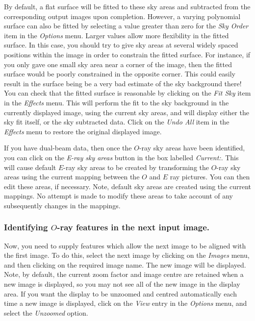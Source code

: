 \documentclass[11pt]{article}
\newcommand{\htmlref}[2]{#1}
\begin{document}
By default, a flat surface will be fitted to these sky areas and
subtracted from the corresponding output images upon completion. However,
a varying polynomial surface can also be fitted by selecting a value
greater than zero for the \htmlref{\emph{Sky Order}}{POLKA_SKYORDER} item
in the \htmlref{\emph{Options}}{POLKA_OPTIONS_MENU} menu. Larger values
allow more flexibility in the fitted surface. In this case, you should
try to give sky areas at several widely spaced positions within the image
in order to constrain the fitted surface. For instance, if you only gave
one small sky area near a corner of the image, then the fitted surface
would be poorly constrained in the opposite corner. This could easily
result in the surface being be a very bad estimate of the sky background
there! You can check that the fitted surface is reasonable by clicking on
the \htmlref{\emph{Fit Sky}}{POLKA_FITSKY_EFFECT} item in the
\htmlref{\emph{Effects}}{POLKA_EFFECTS_MENU} menu. This will perform
the fit to the sky background in the currently displayed image, using the
current sky areas, and will display either the sky fit itself, or the sky
subtracted data. Click on the
\htmlref{\emph{Undo All}}{POLKA_UNDO_ALL_EFFECTS} item in the
\htmlref{\emph{Effects}}{POLKA_EFFECTS_MENU} menu to restore the original
displayed image.

If you have dual-beam data, then once the $O$-ray sky areas have been
identified, you can click on the \emph{E-ray sky areas} button in the box
labelled \htmlref{\emph{Current:}}{POLKA_CURRENT}. This will cause default
$E$-ray sky areas to be created by transforming the $O$-ray sky areas
using the current mapping between the $O$ and $E$ ray pictures. You can
then \htmlref{edit}{POLKA_EDITING_POLYGONS} these
areas, if necessary. Note, default sky areas are created using the
current mappings. No attempt is made to modify these areas to take
account of any subsequently changes in the mappings.

\subsubsection {Identifying $O$-ray features in the next input image.}
Now, you need to supply features which allow the next image to be
aligned with the first image. To do this, select the next image by
clicking on the \htmlref{\emph{Images}}{POLKA_IMAGES} menu, and then
clicking on the required image name. The new image will be displayed.
Note, by default, the current zoom factor and image centre are retained
when a new image is displayed, so you may not see all of the new image in
the display area. If you want the display to be unzoomed and centred
automatically each time a new image is displayed, click on the
\htmlref{\emph{View}}{POLKA_VIEW} entry in the \htmlref{{\em
Options}}{POLKA_OPTIONS_MENU} menu, and select the \emph{Unzoomed} option.
\end{document}
